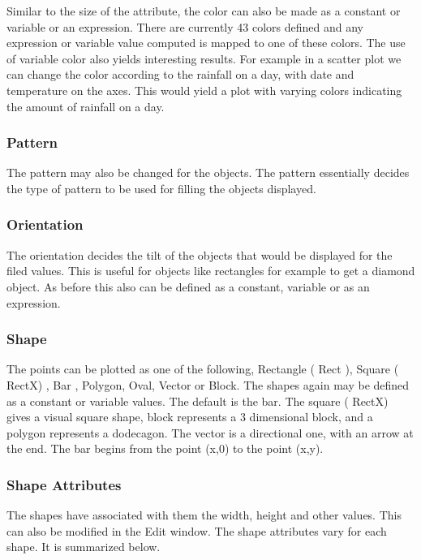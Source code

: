 Similar to the size of the attribute, the color can also be made as a constant or variable or an expression. There are currently 43 colors defined and any expression or variable value computed is mapped to one of these colors. The use of variable color also yields interesting results. For example in a scatter plot we can change the color according to the rainfall on a day, with date and temperature on the axes. This would yield a plot with varying colors indicating the amount of rainfall on a day.

\subsubsection{Pattern}

The pattern may also be changed for the objects. The pattern essentially decides the type of pattern to be used for filling the objects displayed. 

\subsubsection{Orientation}

The orientation decides the tilt of the objects that would be displayed for the filed values. This is useful for objects like rectangles for example to get a diamond object. As before this also can be defined as a constant, variable or as an expression.

\subsubsection{Shape}

The points can be plotted as one of the following, Rectangle ( Rect ), Square ( RectX) , Bar , Polygon, Oval, Vector or Block. The shapes again may be defined as a constant or variable values. The default is the bar. The square ( RectX) gives a visual square shape, block represents a 3 dimensional block, and a polygon represents a dodecagon. The vector is a directional one, with an arrow at the end. The bar begins from the point (x,0) to the point (x,y). 

\subsubsection{Shape Attributes}

The shapes have associated with them the width, height and other values. This can also be modified in the Edit window. The shape attributes vary for each shape. It is summarized below.

